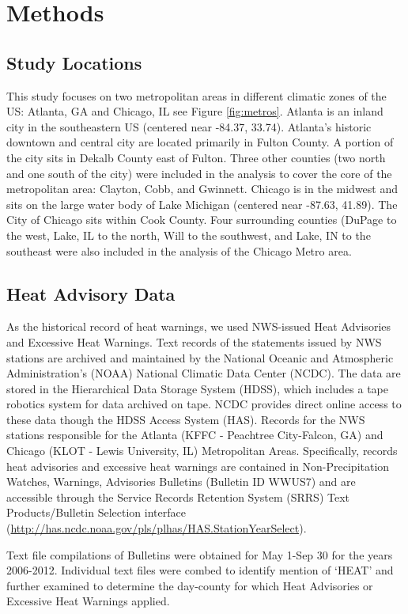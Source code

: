 \documentclass{ametsoc}
\begin{document}
\section{Methods}\label{section:methods}
\subsection{Study Locations}\label{subsec:locations}
This study focuses on two metropolitan areas in different climatic zones of the US: Atlanta, GA and Chicago, IL see Figure \ref{fig:metros}. Atlanta is an inland city in the southeastern US (centered near -84.37, 33.74). Atlanta's historic downtown and central city are located primarily in Fulton County. A portion of the city sits in Dekalb County east of Fulton. Three other counties (two north and one south of the city) were included in the analysis to cover the core of the metropolitan area: Clayton, Cobb, and Gwinnett. Chicago is in the midwest and sits on the large water body of Lake Michigan (centered near -87.63, 41.89).  The City of Chicago sits within Cook County. Four surrounding counties (DuPage to the west, Lake, IL to the north, Will to the southwest, and Lake, IN to the southeast were also included in the analysis of the Chicago Metro area. 

\subsection{Heat Advisory Data}\label{subsec:NWSdata}
As the historical record of heat warnings, we used NWS-issued Heat Advisories and Excessive Heat Warnings. Text records of the statements issued by NWS stations are archived and maintained by the National Oceanic and Atmospheric Administration's (NOAA) National Climatic Data Center (NCDC). The data are stored in the Hierarchical Data Storage System (HDSS), which includes a tape robotics system for data archived on tape. NCDC provides direct online access to these data though the HDSS Access System (HAS). Records for the NWS stations responsible for the Atlanta (KFFC - Peachtree City-Falcon, GA) and Chicago (KLOT - Lewis University, IL) Metropolitan Areas. Specifically, records heat advisories and excessive heat warnings are contained in Non-Precipitation Watches, Warnings, Advisories Bulletins (Bulletin ID WWUS7) and are accessible through the Service Records Retention System (SRRS) Text Products/Bulletin Selection interface (\url{http://has.ncdc.noaa.gov/pls/plhas/HAS.StationYearSelect}).

Text file compilations of Bulletins were obtained for May 1-Sep 30 for the years 2006-2012. Individual text files were combed to identify mention of `HEAT' and further examined to determine the day-county for which Heat Advisories or Excessive Heat Warnings applied. 
\end{document}
